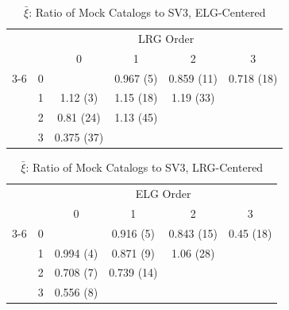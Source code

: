 \documentclass[fleqn,usenatbib]{mnras}
\begin{document}
    \begin{table}
    \caption{$\bar{\xi}$: Ratio of Mock Catalogs to SV3, ELG-Centered}
    \begin{tabular}{ c  c  c  c c c}
    \multicolumn{2}{c}{}&\multicolumn{4}{c}{LRG Order}\\
     \multicolumn{1}{c}{}& &  0&1&  2 &3\\ \cline{3-6}
    
    \multirow[|l|]{4}{*}{\rotatebox[origin=c]{90}{ELG Order}}& \multicolumn{1}{c|}{0} && 0.967 (5) & 0.859 (11)&0.718 (18)\\
     & \multicolumn{1}{c|}{1} &1.12 (3)&1.15 (18)&1.19 (33)&\multicolumn{1}{c}{}\\
    
     &\multicolumn{1}{c|}{2} & 0.81 (24)&1.13 (45)& \multicolumn{2}{c}{}\\
     &\multicolumn{1}{c|}{3} &0.375 (37)& \multicolumn{2}{c}{}\\
    
    \end{tabular}
    
    \end{table}

    \begin{table}
    \caption{$\bar{\xi}$: Ratio of Mock Catalogs to SV3, LRG-Centered}
    \begin{tabular}{ c  c  c  c c c}
    \multicolumn{2}{c}{}&\multicolumn{4}{c}{ELG Order}\\
     \multicolumn{1}{c}{}& &  0&1&  2 &3\\ \cline{3-6}
    
    \multirow[|l|]{4}{*}{\rotatebox[origin=c]{90}{LRG Order}}& \multicolumn{1}{c|}{0} && 0.916 (5) & 0.843 (15)&0.45 (18)\\
     & \multicolumn{1}{c|}{1} &0.994 (4)&0.871 (9)&1.06 (28)&\multicolumn{1}{c}{}\\
    
     &\multicolumn{1}{c|}{2} & 0.708 (7)&0.739 (14)& \multicolumn{2}{c}{}\\
     &\multicolumn{1}{c|}{3} &0.556 (8)& \multicolumn{2}{c}{}\\
    
    \end{tabular}
    
    \end{table}
\end{document}
